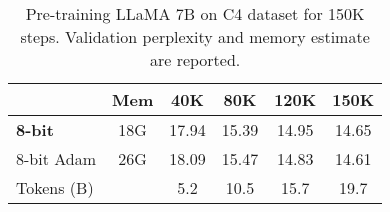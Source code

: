 \begin{table}[t]
    \caption{\small{Pre-training LLaMA 7B on C4 dataset for 150K steps. Validation perplexity and memory estimate are reported.}}
    \label{tab:7b_eval}
    \centering
    \begin{tabular}{l|c|cccc}
    \toprule
    & \textbf{Mem}        & \textbf{40K} & \textbf{80K} & \textbf{120K} & \textbf{150K} \\
    \midrule
    \textbf{8-bit \lowrank{}} & 18G & 17.94 & 15.39 & 14.95 & 14.65 \\
    8-bit Adam & 26G & 18.09 & 15.47 & 14.83 & 14.61 \\
    \midrule
    Tokens (B) & & 5.2 & 10.5 & 15.7 & 19.7 \\
    \bottomrule
    \end{tabular}
    \vskip -5mm
\end{table}

